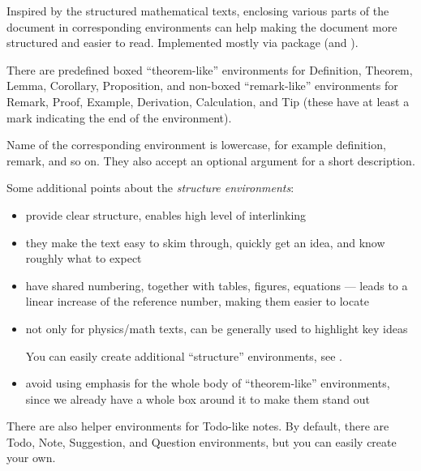 Inspired by the structured mathematical texts, enclosing various parts of the document in corresponding environments can help making the document more structured and easier to read.
Implemented mostly via  package (and ).

\begin{remark}
    There are predefined boxed \enquote{theorem-like} environments for \textsf{Definition}, \textsf{Theorem}, \textsf{Lemma}, \textsf{Corollary}, \textsf{Proposition},
    and non-boxed \enquote{remark-like} environments for \textsf{Remark}, \textsf{Proof}, \textsf{Example}, \textsf{Derivation}, \textsf{Calculation}, and \textsf{Tip} (these have at least a mark indicating the end of the environment).

    Name of the corresponding environment is lowercase, for example \textsf{definition}, \textsf{remark}, and so on.
    They also accept an optional argument for a short description.
\end{remark}

Some additional points about the \emph{structure environments}:
\begin{itemize}
    \item provide clear structure, enables high level of interlinking
    \item they make the text easy to skim through, quickly get an idea, and know roughly what to expect
    \item have shared numbering, together with tables, figures, equations --- leads to a linear increase of the reference number, making them easier to locate
    \item not only for physics/math texts, can be generally used to highlight key ideas
          \begin{tip}
              You can easily create additional \enquote{structure} environments, see .
          \end{tip}
    \item avoid using emphasis for the whole body of \enquote{theorem-like} environments, since we already have a whole box around it to make them stand out
\end{itemize}
\vspace{1ex}

\begin{remark}
    There are also helper environments for \textsf{Todo}-like notes.
    By default, there are \textsf{Todo}, \textsf{Note}, \textsf{Suggestion}, and \textsf{Question} environments, but you can easily create your own.
\end{remark}

